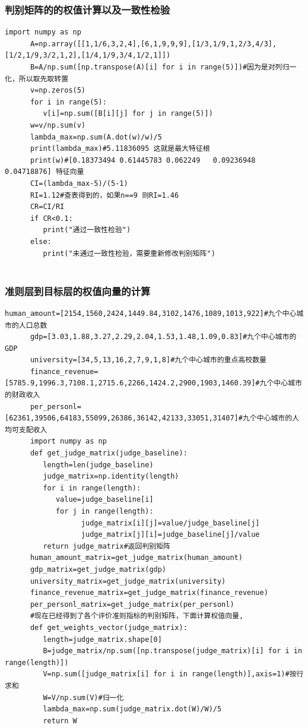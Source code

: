 \documentclass[openany,oneside]{ctexbook}
\begin{document}
\begin{appendix}
   \subsubsection{判别矩阵的的权值计算以及一致性检验}
   \begin{lstlisting}[firstnumber=1]
      import numpy as np
      A=np.array([[1,1/6,3,2,4],[6,1,9,9,9],[1/3,1/9,1,2/3,4/3],[1/2,1/9,3/2,1,2],[1/4,1/9,3/4,1/2,1]])
      B=A/np.sum([np.transpose(A)[i] for i in range(5)])#因为是对列归一化，所以取先取转置
      v=np.zeros(5)
      for i in range(5):
         v[i]=np.sum([B[i][j] for j in range(5)])
      w=v/np.sum(v)
      lambda_max=np.sum(A.dot(w)/w)/5
      print(lambda_max)#5.11836095 这就是最大特征根
      print(w)#[0.18373494 0.61445783 0.062249   0.09236948 0.04718876] 特征向量
      CI=(lambda_max-5)/(5-1)
      RI=1.12#查表得到的，如果n==9 则RI=1.46
      CR=CI/RI
      if CR<0.1:
         print("通过一致性检验")
      else:
         print("未通过一致性检验，需要重新修改判别矩阵")
      
   \end{lstlisting}

   \subsubsection{准则层到目标层的权值向量的计算}
   \begin{lstlisting}[firstnumber=1]
      human_amount=[2154,1560,2424,1449.84,3102,1476,1089,1013,922]#九个中心城市的人口总数
      gdp=[3.03,1.88,3.27,2.29,2.04,1.53,1.48,1.09,0.83]#九个中心城市的GDP
      university=[34,5,13,16,2,7,9,1,8]#九个中心城市的重点高校数量
      finance_revenue=[5785.9,1996.3,7108.1,2715.6,2266,1424.2,2900,1903,1460.39]#九个中心城市的财政收入
      per_personl=[62361,39506,64183,55099,26386,36142,42133,33051,31407]#九个中心城市的人均可支配收入
      import numpy as np
      def get_judge_matrix(judge_baseline):
         length=len(judge_baseline)
         judge_matrix=np.identity(length)
         for i in range(length):
            value=judge_baseline[i]
            for j in range(length):
                  judge_matrix[i][j]=value/judge_baseline[j]
                  judge_matrix[j][i]=judge_baseline[j]/value
         return judge_matrix#返回判别矩阵
      human_amount_matrix=get_judge_matrix(human_amount)
      gdp_matrix=get_judge_matrix(gdp)
      university_matrix=get_judge_matrix(university)
      finance_revenue_matrix=get_judge_matrix(finance_revenue)
      per_personl_matrix=get_judge_matrix(per_personl)
      #现在已经得到了各个评价准则指标的判别矩阵，下面计算权值向量,
      def get_weights_vector(judge_matrix):
         length=judge_matrix.shape[0]
         B=judge_matrix/np.sum([np.transpose(judge_matrix)[i] for i in range(length)])
         V=np.sum([judge_matrix[i] for i in range(length)],axis=1)#按行求和
         W=V/np.sum(V)#归一化
         lambda_max=np.sum(judge_matrix.dot(W)/W)/5
         return W
      


\end{lstlisting}
\end{appendix}
\end{document}
